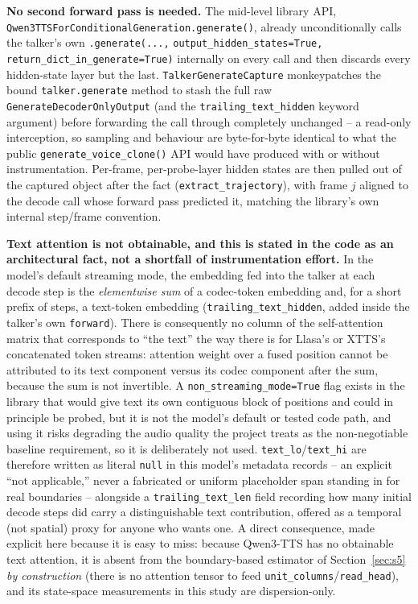 \documentclass[11pt]{article}
\begin{document}
\textbf{No second forward pass is needed.} The mid-level library API,
\texttt{Qwen3TTSForConditionalGeneration.generate()}, already unconditionally
calls the talker's own \texttt{.generate(...,}
\texttt{output\_hidden\_states=True,} \texttt{return\_dict\_in\_generate=True)}
internally on every call and then discards every hidden-state layer but the
last. \texttt{TalkerGenerateCapture} monkeypatches the bound
\texttt{talker.generate} method to stash the full raw
\texttt{GenerateDecoderOnlyOutput} (and the \texttt{trailing\_text\_hidden}
keyword argument) before forwarding the call through completely unchanged --
a read-only interception, so sampling and behaviour are byte-for-byte
identical to what the public \texttt{generate\_voice\_clone()} API would have
produced with or without instrumentation. Per-frame, per-probe-layer hidden
states are then pulled out of the captured object after the fact
(\texttt{extract\_trajectory}), with frame $j$ aligned to the decode call
whose forward pass predicted it, matching the library's own internal
step/frame convention.

\textbf{Text attention is not obtainable, and this is stated in the code as
an architectural fact, not a shortfall of instrumentation effort.} In the
model's default streaming mode, the embedding fed into the talker at each
decode step is the \emph{elementwise sum} of a codec-token embedding and, for
a short prefix of steps, a text-token embedding
(\texttt{trailing\_text\_hidden}, added inside the talker's own
\texttt{forward}). There is consequently no column of the self-attention
matrix that corresponds to ``the text'' the way there is for Llasa's or
XTTS's concatenated token streams: attention weight over a fused position
cannot be attributed to its text component versus its codec component after
the sum, because the sum is not invertible. A \texttt{non\_streaming\_mode=True}
flag exists in the library that would give text its own contiguous block of
positions and could in principle be probed, but it is not the model's
default or tested code path, and using it risks degrading the audio quality
the project treats as the non-negotiable baseline requirement, so it is
deliberately not used. \texttt{text\_lo}/\texttt{text\_hi} are therefore
written as literal \texttt{null} in this model's metadata records -- an
explicit ``not applicable,'' never a fabricated or uniform placeholder span
standing in for real boundaries -- alongside a \texttt{trailing\_text\_len}
field recording how many initial decode steps did carry a distinguishable
text contribution, offered as a temporal (not spatial) proxy for anyone who
wants one. A direct consequence, made explicit here because it is easy to
miss: because Qwen3-TTS has no obtainable text attention, it is absent from
the boundary-based estimator of Section~\ref{sec:s5} \emph{by construction}
(there is no attention tensor to feed \texttt{unit\_columns}/\texttt{read\_head}),
and its state-space measurements in this study are dispersion-only.
\end{document}
